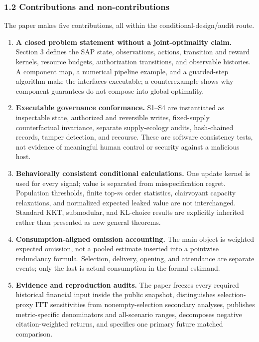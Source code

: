 \documentclass[
  11pt]{article}
\providecommand{\tightlist}{%
  \setlength{\itemsep}{0pt}\setlength{\parskip}{0pt}}
\begin{document}
\subsubsection{1.2 Contributions and
non-contributions}\label{contributions-and-non-contributions}

The paper makes five contributions, all within the
conditional-design/audit route.

\begin{enumerate}
\def\labelenumi{\arabic{enumi}.}
\tightlist
\item
  \textbf{A closed problem statement without a joint-optimality claim.}
  Section 3 defines the SAP state, observations, actions, transition and
  reward kernels, resource budgets, authorization transitions, and
  observable histories. A component map, a numerical pipeline example,
  and a guarded-step algorithm make the interfaces executable; a
  counterexample shows why component guarantees do not compose into
  global optimality.
\item
  \textbf{Executable governance conformance.} S1--S4 are instantiated as
  inspectable state, authorized and reversible writes, fixed-supply
  counterfactual invariance, separate supply-ecology audits,
  hash-chained records, tamper detection, and recourse. These are
  software consistency tests, not evidence of meaningful human control
  or security against a malicious host.
\item
  \textbf{Behaviorally consistent conditional calculations.} One update
  kernel is used for every signal; value is separated from
  misspecification regret. Population thresholds, finite top-\(m\) order
  statistics, clairvoyant capacity relaxations, and normalized expected
  leaked value are not interchanged. Standard KKT, submodular, and
  KL-choice results are explicitly inherited rather than presented as
  new general theorems.
\item
  \textbf{Consumption-aligned omission accounting.} The main object is
  weighted expected omission, not a pooled estimate inserted into a
  pointwise redundancy formula. Selection, delivery, opening, and
  attendance are separate events; only the last is actual consumption in
  the formal estimand.
\item
  \textbf{Evidence and reproduction audits.} The paper freezes every
  required historical financial input inside the public snapshot,
  distinguishes selection-proxy ITT sensitivities from
  nonempty-selection secondary analyses, publishes metric-specific
  denominators and all-scenario ranges, decomposes negative
  citation-weighted returns, and specifies one primary future matched
  comparison.
\end{enumerate}
\end{document}
